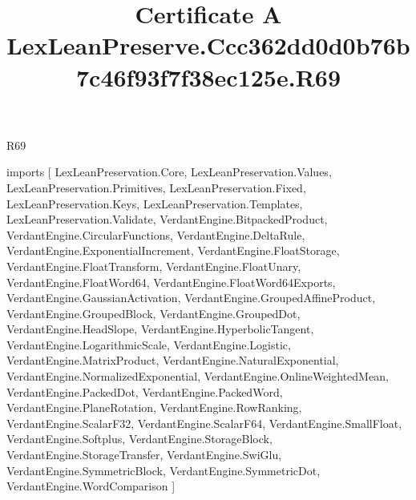 \begin{lexlean}{R69}
\title{Certificate A LexLeanPreserve.Ccc362dd0d0b76b7c46f93f7f38ec125e.R69}
\begin{coremodule}
imports [
  LexLeanPreservation.Core,
  LexLeanPreservation.Values,
  LexLeanPreservation.Primitives,
  LexLeanPreservation.Fixed,
  LexLeanPreservation.Keys,
  LexLeanPreservation.Templates,
  LexLeanPreservation.Validate,
  VerdantEngine.BitpackedProduct,
  VerdantEngine.CircularFunctions,
  VerdantEngine.DeltaRule,
  VerdantEngine.ExponentialIncrement,
  VerdantEngine.FloatStorage,
  VerdantEngine.FloatTransform,
  VerdantEngine.FloatUnary,
  VerdantEngine.FloatWord64,
  VerdantEngine.FloatWord64Exports,
  VerdantEngine.GaussianActivation,
  VerdantEngine.GroupedAffineProduct,
  VerdantEngine.GroupedBlock,
  VerdantEngine.GroupedDot,
  VerdantEngine.HeadSlope,
  VerdantEngine.HyperbolicTangent,
  VerdantEngine.LogarithmicScale,
  VerdantEngine.Logistic,
  VerdantEngine.MatrixProduct,
  VerdantEngine.NaturalExponential,
  VerdantEngine.NormalizedExponential,
  VerdantEngine.OnlineWeightedMean,
  VerdantEngine.PackedDot,
  VerdantEngine.PackedWord,
  VerdantEngine.PlaneRotation,
  VerdantEngine.RowRanking,
  VerdantEngine.ScalarF32,
  VerdantEngine.ScalarF64,
  VerdantEngine.SmallFloat,
  VerdantEngine.Softplus,
  VerdantEngine.StorageBlock,
  VerdantEngine.StorageTransfer,
  VerdantEngine.SwiGlu,
  VerdantEngine.SymmetricBlock,
  VerdantEngine.SymmetricDot,
  VerdantEngine.WordComparison
]


\end{coremodule}
\end{lexlean}
